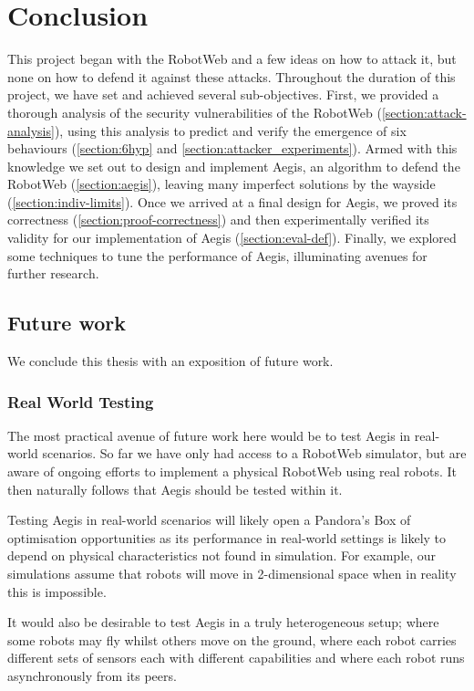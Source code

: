 \chapter{Conclusion}

This project began with the RobotWeb and a few ideas on how to attack it, but none on how to defend it against these attacks. Throughout the duration of this project, we have set and achieved several sub-objectives. First, we provided a thorough analysis of the security vulnerabilities of the RobotWeb (\autoref{section:attack-analysis}), using this analysis to predict and verify the emergence of six behaviours (\autoref{section:6hyp} and \autoref{section:attacker_experiments}). Armed with this knowledge we set out to design and implement Aegis, an algorithm to defend the RobotWeb (\autoref{section:aegis}), leaving many imperfect solutions by the wayside (\autoref{section:indiv-limits}). Once we arrived at a final design for Aegis, we proved its correctness (\autoref{section:proof-correctness}) and then experimentally verified its validity for our implementation of Aegis (\autoref{section:eval-def}). Finally, we explored some techniques to tune the performance of Aegis, illuminating avenues for further research. 

\section{Future work}
\begin{center}
We conclude this thesis with an exposition of future work. 
\end{center}

\subsection{Real World Testing}
The most practical avenue of future work here would be to test Aegis in real-world scenarios. So far we have only had access to a RobotWeb simulator, but are aware of ongoing efforts to implement a physical RobotWeb using real robots. It then naturally follows that Aegis should be tested within it.

Testing Aegis in real-world scenarios will likely open a Pandora's Box of optimisation opportunities as its performance in real-world settings is likely to depend on physical characteristics not found in simulation. For example, our simulations assume that robots will move in 2-dimensional space when in reality this is impossible.

It would also be desirable to test Aegis in a truly heterogeneous setup; where some robots may fly whilst others move on the ground, where each robot carries different sets of sensors each with different capabilities and where each robot runs asynchronously from its peers.


